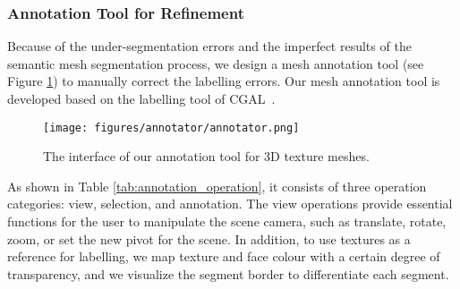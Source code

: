 \subsubsection{Annotation Tool for Refinement}

Because of the under-segmentation errors and the imperfect results of the semantic mesh segmentation process, we design a mesh annotation tool (see Figure \ref{fig:annotator}) to manually correct the labelling errors.
Our mesh annotation tool is developed based on the labelling tool of CGAL~\citep{cgal:eb-20b}.

\begin{figure}[!tb]
	\centering
	\texttt{[image: figures/annotator/annotator.png]}
	\caption{The interface of our annotation tool for 3D texture meshes. }
	\label{fig:annotator}
\end{figure}

As shown in Table \ref{tab:annotation_operation}, it consists of three operation categories: view, selection, and annotation.
The	view operations provide essential functions for the user to manipulate the scene camera, such as translate, rotate, zoom, or set the new pivot for the scene.
In addition, to use textures as a reference for labelling, we map texture and face colour with a certain degree of transparency, and we visualize the segment border to differentiate each segment. 

